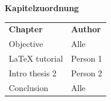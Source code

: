 \textbf{\huge{Kapitelzuordnung}}


{
    \rmfamily
    \setlength{\tabcolsep}{8pt}
    \renewcommand{\arraystretch}{1.15}
    \noindent\begin{tabularx}{\textwidth}{>{\raggedright\arraybackslash}X >{\raggedright\arraybackslash}p{}} %
        \rowcolor{thead}\textbf{Chapter}     & \textbf{Author} \\
        Objective                            & Alle             \\
        LaTeX tutorial                       & Person 1        \\
        Intro thesis 2                       & Person 2        \\
        Conclusion                           & Alle             \\
    \end{tabularx}}
